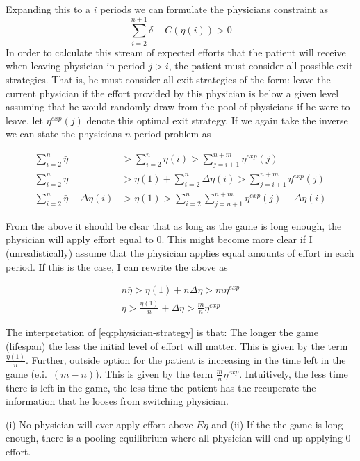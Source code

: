  Expanding this to a $i$ periods we can formulate the physicians constraint as 
 \[
     \sum_{i=2}^{n+1}\delta-C(\eta(i))>0
 \]
In order to calculate this stream of expected efforts that the patient will receive when leaving physician in period $j>i$, the patient must consider all possible exit strategies. That is, he must consider all exit strategies of the form: leave the current physician if the effort provided by this physician is below a given level  assuming that he would randomly draw from the pool of physicians if he were to leave. let $\eta^{exp}(j)$ denote this optimal exit strategy. If we again take the inverse we can state the physicians $n$ period problem as 

\begin{align*}
    \sum_{i=2}^{n} \bar{\eta} &> \sum_{i=2}^{n} \eta(i) > \sum_{j=i+1}^{n+m}  \eta^{exp}(j) \\
    \sum_{i=2}^{n} \bar{\eta} &> \eta(1)+\sum_{i=2}^{n} \Delta\eta(i)  > \sum_{j=i+1}^{n+m}  \eta^{exp}(j) \\
    \sum_{i=2}^{n}\bar{\eta}-\Delta\eta(i) &>\eta(1)>\sum_{i=2}^{n}\sum_{j=n+1}^{n+m}\eta^{exp}(j)-\Delta\eta(i)
\end{align*}

From the above it should be clear that as long as the game is long enough, the physician will apply effort equal to 0. This might become more clear if I (unrealistically) assume that the physician applies equal amounts of effort in each period. If this is the case, I can rewrite the above as 

\begin{align}
     n\bar{\eta} >  \eta(1)+n\Delta\eta  > m\eta^{exp} \\
     \bar{\eta} >  \frac{\eta(1)}{n}+\Delta\eta > \frac{m}{n}\eta^{exp} \label{eq:physician-strategy}
\end{align}

 The interpretation of \cref{eq:physician-strategy} is that: The longer the game (lifespan) the less the initial level of effort will matter. This is given by the term $\frac{\eta(1)}{n}$. Further, outside option for the patient is increasing in the time left in the game (e.i.\ $(m-n)$). This is given by the term $\frac{m}{n}\eta^{exp}$. Intuitively, the less time there is left in the game, the less time the patient has the recuperate the information that he looses from switching physician. 

\begin{proposition}
    (i) No physician will ever apply effort above $E\eta$ and (ii) If the the game is long enough, there is a pooling equilibrium where all physician will end up applying 0 effort.
\end{proposition}

\printbibliography



